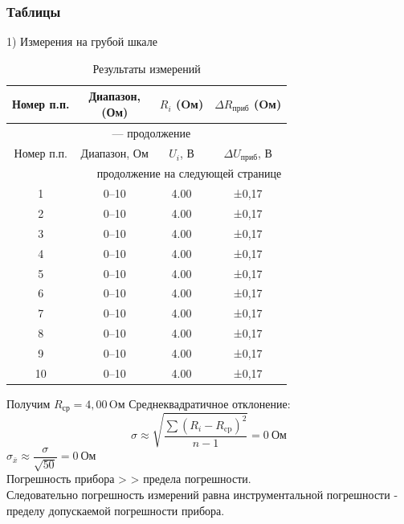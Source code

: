 \documentclass[14pt,a4paper]{extarticle}
\begin{document}
\subsubsection*{Таблицы}
1) Измерения на грубой шкале
{\small

\setlength{\tabcolsep}{4pt}  %
\begin{longtable}{|c|c|c|c|}
\caption{Результаты измерений}
\label{tab:resul}\\
\hline
Номер п.п. & \makecell{Диапазон,\\(Ом)} & \makecell{\(R_i\)\\(Oм)} & \makecell{\(\Delta R_{\text{приб}}\)\\(Oм)} \\
\hline
\endfirsthead

\multicolumn{4}{c}{{\tablename\ \thetable{} — продолжение}} \\
\hline
Номер п.п. & Диапазон, Ом & \(U_i\), В & \(\Delta U_{\text{приб}}\), В \\
\hline
\endhead

\hline
\multicolumn{4}{|r|}{продолжение на следующей странице} \\
\endfoot

\hline
\endlastfoot

1  & 0–10 & 4.00 & ±0,17 \\
2  & 0–10 & 4.00 & ±0,17 \\
3  & 0–10 & 4.00 & ±0,17 \\
4  & 0–10 & 4.00 & ±0,17 \\
5  & 0–10 & 4.00 & ±0,17 \\
6  & 0–10 & 4.00 & ±0,17 \\
7  & 0–10 & 4.00 & ±0,17 \\
8  & 0–10 & 4.00 & ±0,17 \\
9  & 0–10 & 4.00 & ±0,17 \\
10 & 0–10 & 4.00 & ±0,17\\

\end{longtable}
}
Получим \( R_{\text{ср}} = 4,00 \, \text{Oм} \)
Среднеквадратичное отклонение:
\[
\sigma \approx \sqrt{\frac{\sum (R_i - R_{\text{cp}})^{2}}{n-1}} = 0~\text{Ом}
\]
\( \sigma_{\bar{x}} \approx \dfrac{\sigma}{\sqrt{50}} = 0~\text{Ом} \)
\\
Погрешность прибора > > предела погрешности.
\\Следовательно погрешность измерений равна инструментальной погрешности - пределу допускаемой погрешности прибора.
\\
\end{document}
